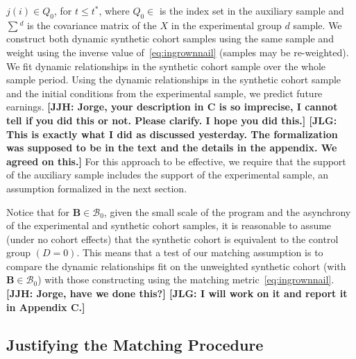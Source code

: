 $j(i) \in Q_0$, for $t \leq t^{\ast}$, where $Q_0 \in$ is the index set in the auxiliary sample and $\sum{^d}$ is the covariance matrix of the $X$ in the experimental group $d$ sample. We construct both dynamic synthetic cohort samples using the same sample and weight using the inverse value of~\eqref{eq:ingrownnail} (samples may be re-weighted). We fit dynamic relationships in the synthetic cohort sample over the whole sample period. Using the dynamic relationships in the synthetic cohort sample and the initial conditions from the experimental sample, we predict future earnings. \textbf{[JJH: Jorge, your description in C is so imprecise, I cannot tell if you did this or not. Please clarify. I hope you did this.] [JLG: This is exactly what I did as discussed yesterday. The formalization was supposed to be in the text and the details in the appendix. We agreed on this.]} For this approach to be effective, we require that the support of the auxiliary sample includes the support of the experimental sample, an assumption formalized in the next section.

Notice that for $\bm{B} \in \mathcal{B}_0$, given the small scale of the program and the asynchrony of the experimental and synthetic cohort samples, it is reasonable to assume (under no cohort effects) that the synthetic cohort is equivalent to the control group $(D=0)$. This means that a test of our matching assumption is to compare the dynamic relationships fit on the unweighted synthetic cohort (with $\bm{B} \in \mathcal{B}_0$) with those constructing using the matching metric~\eqref{eq:ingrownnail}. \textbf{[JJH: Jorge, have we done this?] [JLG: I will work on it and report it in Appendix C.]}

\subsection{Justifying the Matching Procedure}

